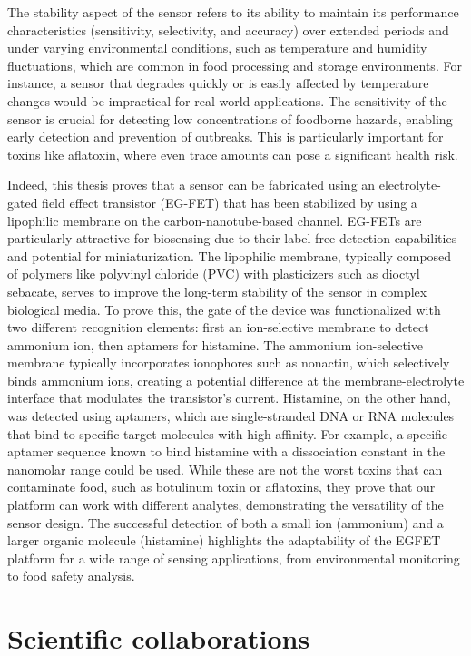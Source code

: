 The stability aspect of the sensor refers to its ability to maintain its performance characteristics (sensitivity, selectivity, and accuracy) over extended periods and under varying environmental conditions, such as temperature and humidity fluctuations, which are common in food processing and storage environments. For instance, a sensor that degrades quickly or is easily affected by temperature changes would be impractical for real-world applications. The sensitivity of the sensor is crucial for detecting low concentrations of foodborne hazards, enabling early detection and prevention of outbreaks. This is particularly important for toxins like aflatoxin, where even trace amounts can pose a significant health risk.

Indeed, this thesis proves that a sensor can be fabricated using an electrolyte-gated field effect transistor (EG-FET) that has been stabilized by using a lipophilic membrane on the carbon-nanotube-based channel. EG-FETs are particularly attractive for biosensing due to their label-free detection capabilities and potential for miniaturization. The lipophilic membrane, typically composed of polymers like polyvinyl chloride (PVC) with plasticizers such as dioctyl sebacate, serves to improve the long-term stability of the sensor in complex biological media. To prove this, the gate of the device was functionalized with two different recognition elements: first an ion-selective membrane to detect ammonium ion, then aptamers for histamine. The ammonium ion-selective membrane typically incorporates ionophores such as nonactin, which selectively binds ammonium ions, creating a potential difference at the membrane-electrolyte interface that modulates the transistor's current. Histamine, on the other hand, was detected using aptamers, which are single-stranded DNA or RNA molecules that bind to specific target molecules with high affinity. For example, a specific aptamer sequence known to bind histamine with a dissociation constant in the nanomolar range could be used. While these are not the worst toxins that can contaminate food, such as botulinum toxin or aflatoxins, they prove that our platform can work with different analytes, demonstrating the versatility of the sensor design. The successful detection of both a small ion (ammonium) and a larger organic molecule (histamine) highlights the adaptability of the EGFET platform for a wide range of sensing applications, from environmental monitoring to food safety analysis.

\section{Scientific collaborations}

